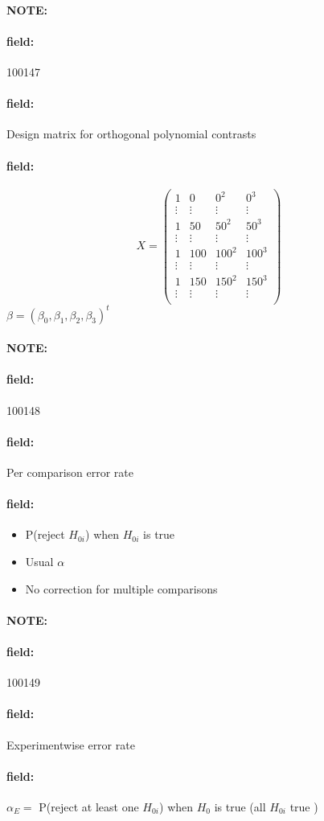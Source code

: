 \documentclass[12pt]{article}
\newenvironment{note}{\paragraph{NOTE:}}{}
\newenvironment{field}{\paragraph{field:}}{}
\begin{document}
\begin{note}
 \begin{field}
  \tiny 100147
 \end{field}
 \begin{field}
  Design matrix for orthogonal polynomial contrasts
 \end{field}
 \begin{field}
  $$ X = \begin{pmatrix}
    1      & 0      & 0^2    & 0^3    \\
    \vdots & \vdots & \vdots & \vdots \\
    1      & 50     & 50^2   & 50^3   \\
    \vdots & \vdots & \vdots & \vdots \\
    1      & 100    & 100^2  & 100^3  \\
    \vdots & \vdots & \vdots & \vdots \\
    1      & 150    & 150^2  & 150^3  \\
    \vdots & \vdots & \vdots & \vdots \\
   \end{pmatrix}$$
  $ \beta = (\beta_0, \beta_1, \beta_2, \beta_3)^t$
 \end{field}
\end{note}


\begin{note}
 \begin{field}
  \tiny 100148
 \end{field}
 \begin{field}
  Per comparison error rate
 \end{field}
 \begin{field}
  \begin{itemize}
   \item P(reject $H_{0i}$) when $H_{0i}$ is true
   \item Usual $\alpha$
   \item No correction for multiple comparisons
  \end{itemize}
 \end{field}
\end{note}

\begin{note}
 \begin{field}
  \tiny 100149
 \end{field}
 \begin{field}
  Experimentwise error rate
 \end{field}
 \begin{field}
  $\alpha_E = $ P(reject at least one $H_{0i}$) when $H_0$ is true (all $H_{0i}$ true )
 \end{field}
\end{note}
\end{document}
